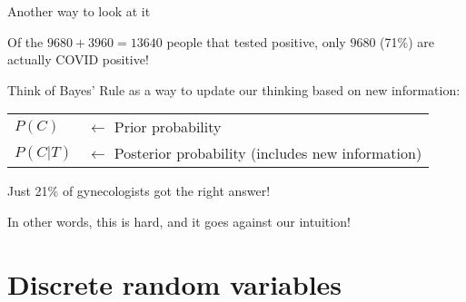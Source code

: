\documentclass{beamer}\usepackage[]{graphicx}\usepackage[]{color}
\begin{document}
\begin{darkframes}
\begin{frame}{Another way to look at it}
  \pause

  Of the $9680+3960=13640$ people that tested positive, only $9680$ (71\%) are actually COVID positive!
  
\end{frame}

\begin{frame}
  Think of Bayes' Rule as a way to update our thinking based on new information:

  \bigskip

  \begin{center}
    \begin{tabular}{ll}
      $P(C)$ & $\longleftarrow$ Prior probability \\
      $P(C|T)$ & $\longleftarrow$ Posterior probability (includes new information) \\
    \end{tabular}
  \end{center}
  
\end{frame}

\begin{frame}
\end{frame}

\begin{frame}
  Just 21\% of gynecologists got the right answer!
  \bigskip\pause

  In other words, this is hard, and it goes against our intuition!
\end{frame}

\section{Discrete random variables}


\end{darkframes}
\end{document}

